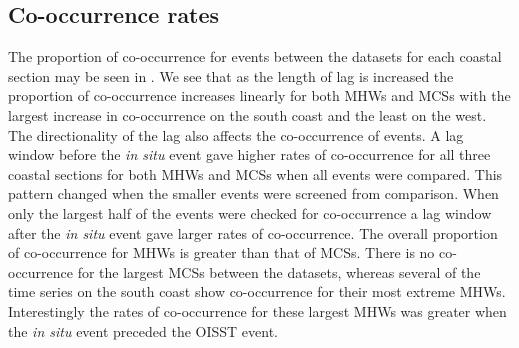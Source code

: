 \documentclass[a4paper,10pt,review]{elsarticle}
\begin{document}
\subsection{Co-occurrence rates}
The proportion of co-occurrence for events between the datasets for each coastal section may be seen in . We see that as the length of lag is increased the proportion of co-occurrence increases linearly for both MHWs and MCSs with the largest increase in co-occurrence on the south coast and the least on the west. The directionality of the lag also affects the co-occurrence of events. A lag window before the \emph{in situ} event gave higher rates of co-occurrence for all three coastal sections for both MHWs and MCSs when all events were compared. This pattern changed when the smaller events were screened from comparison. When only the largest half of the events were checked for co-occurrence a lag window after the \emph{in situ} event gave larger rates of co-occurrence. The overall proportion of co-occurrence for MHWs is greater than that of MCSs. There is no co-occurrence for the largest MCSs between the datasets, whereas several of the time series on the south coast show co-occurrence for their most extreme MHWs. Interestingly the rates of co-occurrence for these largest MHWs was greater when the \emph{in situ} event preceded the OISST event.
\end{document}
